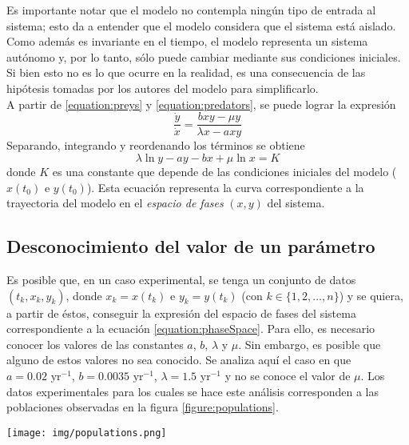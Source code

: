 \documentclass[journal, monochrome]{IEEEtran}
\begin{document}
Es importante notar que el modelo no contempla ningún tipo de entrada al sistema; esto da a entender que el modelo considera que el sistema está aislado. Como además es invariante
en el tiempo, el modelo representa un sistema autónomo y, por lo tanto, sólo puede cambiar mediante sus condiciones iniciales. Si bien esto no es lo que ocurre en la realidad,
es una consecuencia de las hipótesis tomadas por los autores del modelo para simplificarlo.\\

A partir de \ref{equation:preys} y \ref{equation:predators}, se puede lograr la expresión
\begin{equation}
\frac{\dot{y}}{\dot{x}} = \frac{b x y - \mu y}{\lambda x - a x y}
\end{equation}
Separando, integrando y reordenando los términos se obtiene
\begin{equation}
\lambda \ln y - a y - b x + \mu \ln x = K
\label{equation:phaseSpace}
\end{equation}
donde $K$ es una constante que depende de las condiciones iniciales del modelo ($x(t_0)$ e $y(t_0)$).
Esta ecuación representa la curva correspondiente a la trayectoria del modelo en el \emph{espacio de fases} $(x, y)$ del sistema.

\subsection{Desconocimiento del valor de un parámetro}

Es posible que, en un caso experimental, se tenga un conjunto de datos $(t_k, x_k, y_k)$, donde $x_k = x(t_k)$ e $y_k = y(t_k)$ (con $k \in \{1, 2, \dots, n\}$) 
y se quiera, a partir de éstos, conseguir la expresión del espacio de fases del sistema correspondiente a la ecuación \ref{equation:phaseSpace}. Para ello, es 
necesario conocer los valores de las constantes $a$, $b$, $\lambda$ y $\mu$. Sin embargo, es posible que alguno de estos valores no sea conocido. Se analiza 
aquí el caso en que $a = 0.02 \text{ yr}^{-1}$, $b = 0.0035 \text{ yr}^{-1}$, $\lambda = 1.5 \text{ yr}^{-1}$ y no se conoce el valor de $\mu$. Los datos experimentales para los cuales se hace este análisis corresponden a las poblaciones observadas en la figura \ref{figure:populations}.\\

\begin{figure*}[htbp]
	\centering
	\texttt{[image: img/populations.png]}
	\caption{Gráfico de las poblaciones en función del tiempo para el conjunto de datos utilizado.}
	\label{figure:populations}
\end{figure*}
\end{document}
